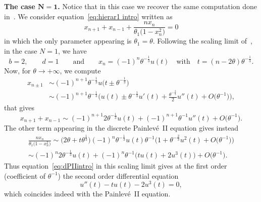 \documentclass[pdftex]{sigma}%
\numberwithin{equation}{section}
\begin{document}
{\bf The case $\boldsymbol{N=1}$.} Notice that in this case we recover the same computation done in~\cite[Chapter 9]{Borodindiscrete}.
We consider equation~\eqref{eq:hierar1 intro} written as
\begin{equation*}
	x_{n+1}+x_{n-1}+\frac{nx_n}{\theta_1\big(1-x_n^2\big)}=0
\end{equation*}
in which the only parameter appearing is $\theta_1=\theta$. Following the scaling limit of~\cite[Theorem~1]{betea2021multicritical}, in the case $N=1$, we have
\begin{equation*}
	b=2,\qquad d=1\qquad\text{and}\qquad x_n = (-1)^n \theta^{-\frac{1}{3}}u(t) \quad\text{with}\quad t=(n-2\theta)\theta^{-\frac{1}{3}}.
\end{equation*}
Now, for $\theta\rightarrow +\infty$, we compute
\begin{align*}
	x_{n\pm 1} &\sim (-1)^{n+1}\theta^{-\frac{1}{3}} u\big(t\pm \theta^{-\frac{1}{3}}\big)\\
	&\sim (-1)^{n+1}\theta^{-\frac{1}{3}} \bigg(u(t)\pm\theta^{-\frac{1}{3}}u'(t) +\frac{\theta^{-\frac{2}{3}}}{2}u''(t)+O\big(\theta^{-1}\big)\bigg),
\end{align*}
that gives
\begin{equation*}
	x_{n+1}+x_{n-1} \sim (-1)^{n+1}2\theta^{-\frac{1}{3}}u(t)+ (-1)^{n+1}\theta^{-1}u''(t) + O\big(\theta^{-1}\big).
\end{equation*}
The other term appearing in the discrete Painlev\'e~II equation gives instead
\begin{align*}
	\frac{nx_n}{\theta_1\big(1-x_n^2\big)}\sim \big(2\theta +t\theta^{\frac{1}{3}}\big)(-1)^n \theta^{-\frac{1}{3}}u(t) \theta^{-1}\bigg(1 + \theta^{-\frac{2}{3}}u^2(t) +O\big(\theta^{-1}\big)\bigg)
\\
	\sim (-1)^n2\theta^{-\frac{1}{3}}u(t)+(-1)^n \theta^{-1}\big(tu(t) + 2u^3(t)\big) +O\big(\theta^{-1}\big).
\end{align*}
Thus equation~\eqref{eq:dPIIintro} in this scaling limit gives at the first order (coefficient of $\theta^{-1}$) the second order differential equation
\begin{equation*}
	u''(t)-tu(t)-2u^3(t) =0,
\end{equation*}
which coincides indeed with the Painlev\'e~II equation.
\end{document}
